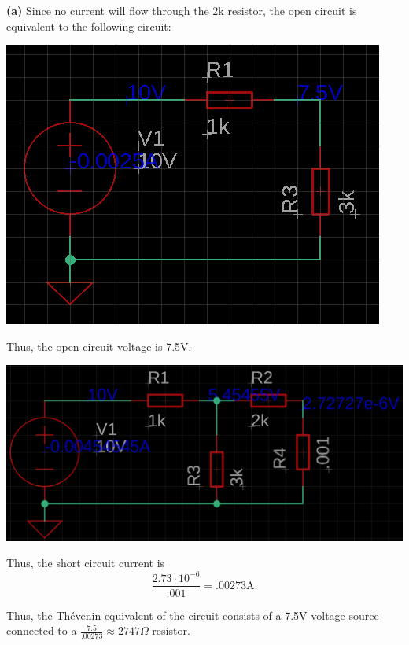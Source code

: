 \documentclass{article}
\begin{document}
{\bf (a)}
Since no current will flow through the 2k resistor, the open circuit is equivalent to the following circuit:
\begin{center}
\includegraphics[scale=.5]{schematic04.png}
\end{center}
Thus, the open circuit voltage is 7.5V.

\begin{center}
\includegraphics[scale=0.25]{schematic042.png}
\end{center}
Thus, the short circuit current is $$\frac{2.73 \cdot 10^{-6}}{.001} = .00273\text{A}.$$

Thus, the Thévenin equivalent of the circuit consists of a 7.5V voltage source connected to a $\frac{7.5}{.00273} \approx 2747\Omega$ resistor.
\end{document}
